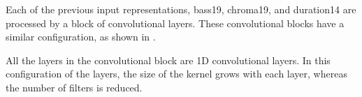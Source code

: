 

Each of the previous input representations, \gls{bass19},
\gls{chroma19}, and \gls{duration14} are processed by a
block of convolutional layers. These convolutional blocks
have a similar configuration, as shown in
.


All the layers in the convolutional block are 1D
convolutional layers. In this configuration of the layers,
the size of the kernel grows with each layer, whereas the
number of filters is reduced.

